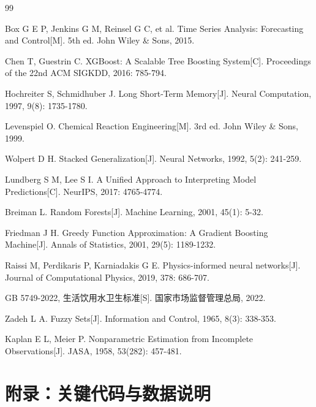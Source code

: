 \documentclass[12pt,a4paper]{ctexart}
\begin{document}
\begin{thebibliography}{99}

 Box G E P, Jenkins G M, Reinsel G C, et al. Time Series Analysis: Forecasting and Control[M]. 5th ed. John Wiley \& Sons, 2015.

 Chen T, Guestrin C. XGBoost: A Scalable Tree Boosting System[C]. Proceedings of the 22nd ACM SIGKDD, 2016: 785-794.

 Hochreiter S, Schmidhuber J. Long Short-Term Memory[J]. Neural Computation, 1997, 9(8): 1735-1780.

 Levenspiel O. Chemical Reaction Engineering[M]. 3rd ed. John Wiley \& Sons, 1999.

 Wolpert D H. Stacked Generalization[J]. Neural Networks, 1992, 5(2): 241-259.

 Lundberg S M, Lee S I. A Unified Approach to Interpreting Model Predictions[C]. NeurIPS, 2017: 4765-4774.

 Breiman L. Random Forests[J]. Machine Learning, 2001, 45(1): 5-32.

 Friedman J H. Greedy Function Approximation: A Gradient Boosting Machine[J]. Annals of Statistics, 2001, 29(5): 1189-1232.

 Raissi M, Perdikaris P, Karniadakis G E. Physics-informed neural networks[J]. Journal of Computational Physics, 2019, 378: 686-707.

 GB 5749-2022, 生活饮用水卫生标准[S]. 国家市场监督管理总局, 2022.

 Zadeh L A. Fuzzy Sets[J]. Information and Control, 1965, 8(3): 338-353.

 Kaplan E L, Meier P. Nonparametric Estimation from Incomplete Observations[J]. JASA, 1958, 53(282): 457-481.

\end{thebibliography}

\newpage

\section*{附录：关键代码与数据说明}
\end{document}
